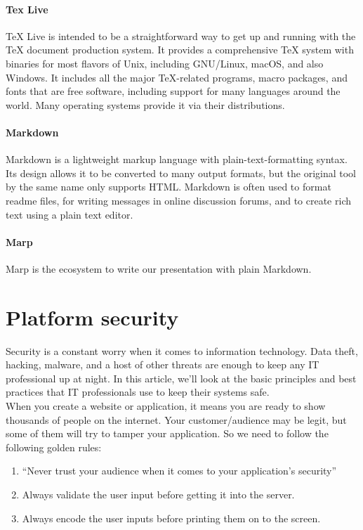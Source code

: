 \paragraph*{Tex Live}
TeX Live is intended to be a straightforward way to get up and running with the TeX document production system. It provides a comprehensive TeX system with binaries for most flavors of Unix, including GNU/Linux, macOS, and also Windows. It includes all the major TeX-related programs, macro packages, and fonts that are free software, including support for many languages around the world. Many operating systems provide it via their distributions.



\paragraph*{Markdown}
Markdown is a lightweight markup language with plain-text-formatting syntax. Its design allows it to be converted to many output formats, but the original tool by the same name only supports HTML. Markdown is often used to format readme files, for writing messages in online discussion forums, and to create rich text using a plain text editor.
\paragraph*{Marp}
Marp is the ecosystem to write our presentation with plain Markdown.


\section{Platform security}
Security is a constant worry when it comes to information technology. Data theft, hacking, malware, and a host of other threats are enough to keep any IT professional up at night. In this article, we’ll look at the basic principles and best practices that IT professionals use to keep their systems safe.
\\
When you create a website or application, it means you are ready to show thousands of people on the internet. Your customer/audience may be legit, but some of them will try to tamper your application. So we need to follow the following golden rules:
\begin{enumerate}
      \item 
      “Never trust your audience when it comes to your application’s security”
      \item 
      Always validate the user input before getting it into the server.
      \item 
      Always encode the user inputs before printing them on to the screen.
\end{enumerate}

